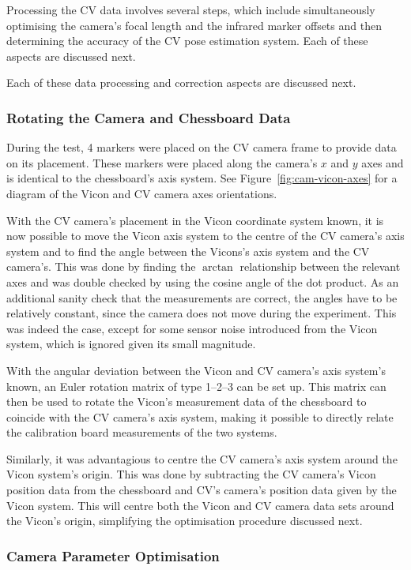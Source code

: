 Processing the CV data involves several steps, which include simultaneously optimising the camera's focal length and the infrared marker offsets and then determining the accuracy of the CV pose estimation system. Each of these aspects are discussed next.

Each of these data processing and correction aspects are discussed next. 

\subsubsection{Rotating the Camera and Chessboard Data}
\label{sec:rotate-axes}

During the test, 4 markers were placed on the CV camera frame to provide data on its placement. These markers were placed along the camera's $x$ and $y$ axes and is identical to the chessboard's axis system. See Figure~\ref{fig:cam-vicon-axes} for a diagram of the Vicon and CV camera axes orientations.

With the CV camera's placement in the Vicon coordinate system known, it is now possible to move the Vicon axis system to the centre of the CV camera's axis system and to find the angle between the Vicons's axis system and the CV camera's. This was done by finding the $\arctan$ relationship between the relevant axes and was double checked by using the cosine angle of the dot product. As an additional sanity check that the measurements are correct, the angles have to be relatively constant, since the camera does not move during the experiment. This was indeed the case, except for some sensor noise introduced from the Vicon system, which is ignored given its small magnitude. 

With the angular deviation between the Vicon and CV camera's axis system's known, an Euler rotation matrix of type 1--2--3 can be set up. This matrix can then be used to rotate the Vicon's measurement data of the chessboard to coincide with the CV camera's axis system, making it possible to directly relate the calibration board measurements of the two systems. 

Similarly, it was advantagious to centre the CV camera's axis system around the Vicon system's origin. This was done by subtracting the CV camera's Vicon position data from the chessboard and CV's camera's position data given by the Vicon system. This will centre both the Vicon and CV camera data sets around the Vicon's origin, simplifying the optimisation procedure discussed next. 

\subsubsection{Camera Parameter Optimisation}
\label{sec:focal-optimisation}

